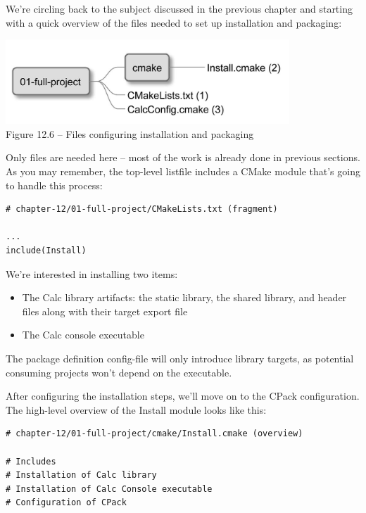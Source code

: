 
We're circling back to the subject discussed in the previous chapter and starting with a quick overview of the files needed to set up installation and packaging:

\begin{center}
\includegraphics[width=0.8\textwidth]{content/3/chapter12/images/6.jpg}\\
Figure 12.6 – Files configuring installation and packaging
\end{center}

Only files are needed here – most of the work is already done in previous sections. As you may remember, the top-level listfile includes a CMake module that's going to handle this process:

\begin{lstlisting}[style=styleCMake]
# chapter-12/01-full-project/CMakeLists.txt (fragment)

...
include(Install)
\end{lstlisting}

We're interested in installing two items:

\begin{itemize}
\item 
The Calc library artifacts: the static library, the shared library, and header files along with their target export file

\item 
The Calc console executable
\end{itemize}

The package definition config-file will only introduce library targets, as potential consuming projects won't depend on the executable.

After configuring the installation steps, we'll move on to the CPack configuration. The high-level overview of the Install module looks like this:

\begin{lstlisting}[style=styleCMake]
# chapter-12/01-full-project/cmake/Install.cmake (overview)

# Includes
# Installation of Calc library
# Installation of Calc Console executable
# Configuration of CPack
\end{lstlisting}

